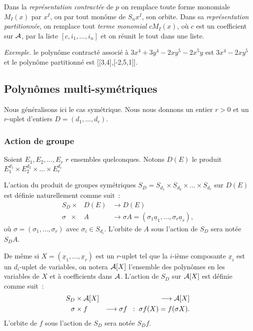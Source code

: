 \documentclass[11pt]{article}
\begin{document}
Dans la {\it repr\'esentation contract\'ee} de $p$
on remplace toute forme monomiale $M_I(x)$ par $x^I$, ou par tout mon\^ome
de $S_nx^I$, son orbite. 
Dans sa {\it repr\'esentation partitionn\'{e}e}, on remplace tout {\it terme
monomial}  $cM_I(x)$, o\`u $c$ est un coefficient sur $\cal A$, par la liste
$[c,i_1,\ldots ,i_n]$ et on r\'eunit le tout dans une liste.

{\it Exemple.} le polyn\^{o}me contract\'{e} associ\'{e} \`{a} 
$3x^4 + 3y^4 -2xy^5 -2x^5y$ est 
$3x^4 -2xy^5$ et le polyn\^{o}me partitionn\'{e} est
[[3,4],[-2,5,1]].\\

\subsection{Polyn\^omes multi-sym\'etriques}
Nous g\'en\'eralisons ici le cas sym\'etrique.
Nous nous donnons un entier $r >0$ et un $r$-uplet d'entiers 
$D=(d_1, \ldots ,d_r)$.

\subsubsection*{Action de groupe}

Soient $E_1, E_2, \ldots ,E_r$ $r$ ensembles quelconques.
Notons $D(E)$ le produit $E_1^{d_1}\times E_2^{d_2}\times \ldots \times E_r^{d_r}$

L'action du produit de groupes  sym\'etriques 
$S_D=S_{d_1}\times S_{d_2} \times \ldots \times S_{d_r}$ sur $D(E)$ est 
d\'efinie naturellement comme suit~:  
\begin{eqnarray*}
            S_D \times& D(E) & \longrightarrow  D(E)\\
           \sigma\;\;  \times & A  & \longrightarrow 
         \sigma A=(\sigma_1{\underline a}_1,\ldots ,\sigma_r{\underline a}_r),
\end{eqnarray*}
o\`u $\sigma = (\sigma_1,\ldots ,\sigma_r)$ avec $\sigma_i \in
S_{d_i}$. L'orbite de $A$ sous l'action de $S_D$ sera
not\'ee $S_DA$. 

De m\^eme si $X=({\underline x}_1, \ldots,{\underline x}_r)$ est un 
$r$-uplet tel que la $i$-i\`eme composante
${\underline x}_i$ est un $d_i$-uplet de variables, on notera ${\cal A}[X]$
l'ensemble des polyn\^omes en les variables de $X$ et \`a coefficients dans 
$\cal A$. 
L'action de $S_D$ sur ${\cal A}[X]$ est d\'efinie
comme suit~:
\begin{eqnarray*}
            S_D & \times {\cal A}[X] & \longrightarrow {\cal A}[X]\\
           \sigma & \times f  & \longrightarrow \sigma f \;\; :\;
         \sigma f(X)= f(\sigma X).
\end{eqnarray*}
L'orbite de $f$ sous l'action de $S_D$ sera
not\'ee $S_Df$.
\end{document}
